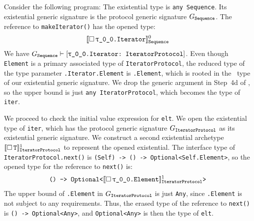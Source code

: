 \documentclass[../generics]{subfiles}
\begin{document}
\begin{example}
Consider the following program:
The existential type is \texttt{any Sequence}. Its existential generic signature is the protocol generic signature $G_{\texttt{Sequence}}$. The reference to \texttt{makeIterator()} has the opened type:
\[
\Exist{\rT.Iterator}^0_\texttt{Sequence}
\]
We have $G_\tSequence \vdash \ConfReq{\rT.Iterator}{IteratorProtocol}$. Even though \texttt{Element} is a primary associated type of \texttt{IteratorProtocol}, the reduced type of the type parameter \texttt{\rT.Iterator.Element} is \texttt{\rT.Element}, which is rooted in the \tSelf\ type of our existential generic signature. We drop the generic argument in Step~4d of , so the upper bound is just \texttt{any IteratorProtocol}, which becomes the type of \texttt{iter}.

We proceed to check the initial value expression for \texttt{elt}. We open the existential type of \texttt{iter}, which has the protocol generic signature $G_{\texttt{IteratorProtocol}}$ as its existential generic signature. We construct a second existential archetype $[\![\Box\,\texttt{T}]\!]^1_\texttt{IteratorProtocol}$ to represent the opened existential. The interface type of \texttt{IteratorProtocol.next()} is \texttt{(Self) -> () -> Optional<Self.Element>}, so the opened type for the reference to \texttt{next()} is:
\[
\texttt{() -> Optional<$\Exist{\rT.Element}^1_\texttt{IteratorProtocol}$>}
\]
The upper bound of \texttt{\rT.Element} in $G_{\texttt{IteratorProtocol}}$ is just \texttt{Any}, since \texttt{\rT.Element} is not subject to any requirements. Thus, the erased type of the reference to \texttt{next()} is \texttt{() -> Optional<Any>}, and \texttt{Optional<Any>} is then the type of \texttt{elt}.
\end{example}
\end{document}
